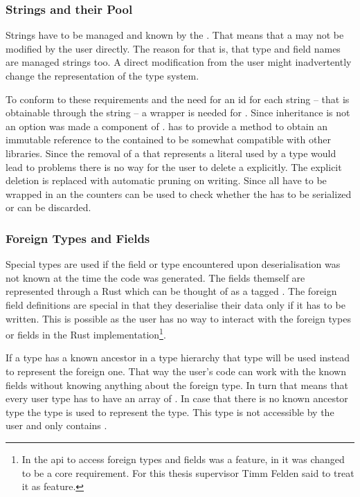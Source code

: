 \documentclass[thesis]{subfiles}
\begin{document}
    \subsubsection{Strings and their Pool}
      Strings have to be managed and known by the \StringPool.
      That means that a \String may not be modified by the user directly.
      The reason for that is, that type and field names are managed strings too.
      A direct modification from the user might inadvertently change the representation of the type system.

      To conform to these requirements and the need for an id for each string -- that is obtainable through the string -- a wrapper is needed for \String.
      Since inheritance is not an option \String was made a component of \SkillString.
      \SkillString has to provide a method to obtain an immutable reference to the contained \String to be somewhat compatible with other libraries.
      Since the removal of a \SkillString that represents a literal used by a type would lead to problems there is no way for the user to delete a \SkillString explicitly.
      The explicit deletion is replaced with automatic pruning on writing.
      Since all \SkillString have to be wrapped in an \RcT the counters can be used to check whether the \SkillString has to be serialized or can be discarded.

    \subsubsection{Foreign Types and Fields}
      Special types are used if the field or type encountered upon deserialisation was not known at the time the code was generated.
      The fields themself are represented through a Rust \enum which can be thought of as a tagged .
      The foreign field definitions are special in that they deserialise their data only if it has to be written.
      This is possible as the user has no way to interact with the foreign types or fields in the Rust implementation\footnote{%
        In \autocite{skill-tr13} the \gls{api} to access foreign types and fields was a feature, in \autocite{skill-tr} it was changed to be a core requirement. For this thesis supervisor Timm Felden said to treat it as feature.
      }.

      If a type has a known ancestor in a type hierarchy that type will be used instead to represent the foreign one.
      That way the user's code can work with the known fields without knowing anything about the foreign type.
      In turn that means that every user type has to have an array of \ForeignFieldData.
      In case that there is no known ancestor type the \Foreign type is used to represent the type.
      This type is not accessible by the user and only contains \ForeignFieldData.
\end{document}
